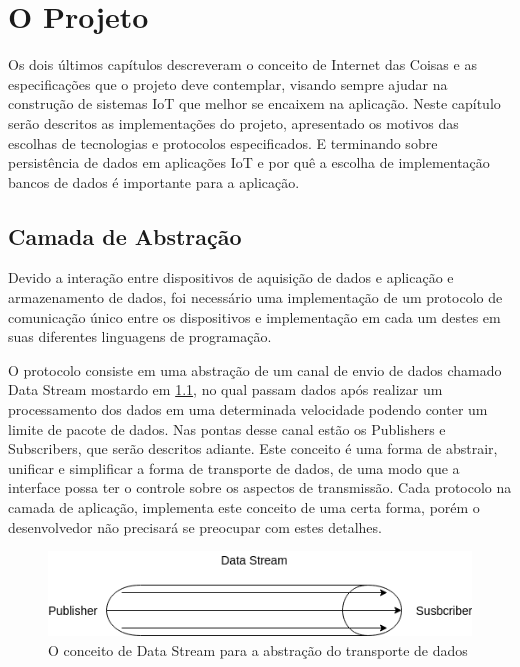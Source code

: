 \chapter{O Projeto}
\label{chapter:projeto}

Os dois últimos capítulos descreveram o conceito de Internet das Coisas e as especificações que o projeto deve contemplar, visando sempre ajudar na construção de sistemas IoT que melhor se encaixem na aplicação. Neste capítulo serão descritos as implementações do projeto, apresentado os motivos das escolhas de tecnologias e protocolos especificados. E terminando sobre persistência de dados em aplicações IoT e por quê a escolha de implementação bancos de dados é importante para a aplicação.


\section{Camada de Abstração}
\label{section:camada_abstracao}

Devido a interação entre dispositivos de aquisição de dados e aplicação e armazenamento de dados, foi necessário uma implementação de um protocolo de comunicação único entre os dispositivos e implementação em cada um destes em suas diferentes linguagens de programação.

O protocolo consiste em uma abstração de um canal de envio de dados chamado Data Stream mostardo em \ref{fig:3.1.0/data_stream}, no qual passam dados após realizar um processamento dos dados em uma determinada velocidade podendo conter um limite de pacote de dados. Nas pontas desse canal estão os Publishers e Subscribers, que serão descritos adiante. Este conceito é uma forma de abstrair, unificar e simplificar a forma de transporte de dados, de uma modo que a interface possa ter o controle sobre os aspectos de transmissão. Cada protocolo na camada de aplicação, implementa este conceito de uma certa forma, porém o desenvolvedor não precisará se preocupar com estes detalhes.

\begin{figure}[h!]

\centering
\includegraphics[width=13cm]{./02_Capitulos/02_Cap3/figures/data_stream}
\caption{O conceito de Data Stream para a abstração do transporte de dados}
\label{fig:3.1.0/data_stream}
\end{figure}


